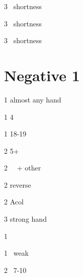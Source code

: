 \documentclass[12pt, a4paper]{report}
\begin{document}
{            
            \begin{thoptions}
                \item[3\hearts] \hearts\ shortness
                \item[3\spades] \spades\ shortness
                \item[3\nt] \clubs\ shortness
            \end{thoptions}
        }

        \section*{\colorbox{blue!30}{Negative 1\diams}}
         {

            \begin{thoptions}
                \item[1\hearts] almost any hand
                \item[1\spades] 4\spades
                \item[1\nt] 18-19 \bal
                \item[2\clubs] 5+\clubs
                \item[2\diams] \gf\ \clubs\ + other
                \item[2\major] reverse \nf
                \item[2\nt] Acol \clubs
                \item[3\clubs] \clubs strong hand \nf
            \end{thoptions}

            \begin{thoptions}
                \item[1\spades] \nt
                \item[1\nt] \minor\ weak
                \item[2\minor] \nat\ 7-10
            \end{thoptions}
        }
\end{document}
